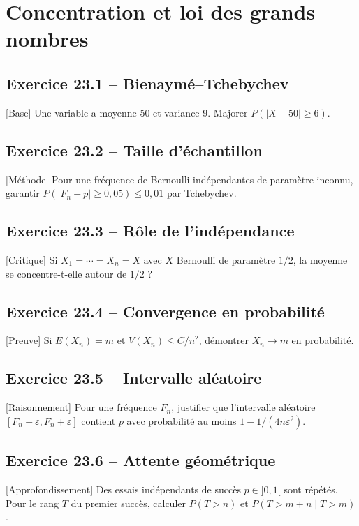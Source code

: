 \chapter{Concentration et loi des grands nombres}
\section*{Exercice 23.1 -- Bienaymé--Tchebychev}
[Base] Une variable a moyenne 50 et variance 9. Majorer $P(|X-50|\ge6)$.

\section*{Exercice 23.2 -- Taille d’échantillon}
[Méthode] Pour une fréquence de Bernoulli indépendantes de paramètre inconnu, garantir $P(|F_n-p|\ge0{,}05)\le0{,}01$ par Tchebychev.

\section*{Exercice 23.3 -- Rôle de l’indépendance}
[Critique] Si $X_1=\cdots=X_n=X$ avec $X$ Bernoulli de paramètre $1/2$, la moyenne se concentre-t-elle autour de $1/2$ ?

\section*{Exercice 23.4 -- Convergence en probabilité}
[Preuve] Si $E(X_n)=m$ et $V(X_n)\le C/n^2$, démontrer $X_n\to m$ en probabilité.

\section*{Exercice 23.5 -- Intervalle aléatoire}
[Raisonnement] Pour une fréquence $F_n$, justifier que l'intervalle aléatoire $[F_n-\varepsilon,F_n+\varepsilon]$ contient $p$ avec probabilité au moins $1-1/(4n\varepsilon^2)$.

\section*{Exercice 23.6 -- Attente géométrique}
[Approfondissement] Des essais indépendants de succès $p\in]0,1[$ sont répétés. Pour le rang $T$ du premier succès, calculer $P(T>n)$ et $P(T>m+n\mid T>m)$.
